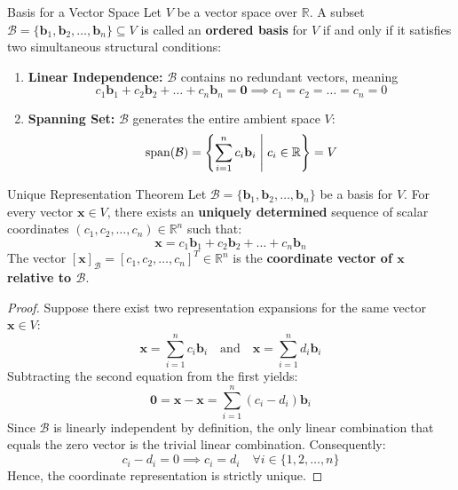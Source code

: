 \begin{definitionbox}{Basis for a Vector Space}
Let $V$ be a vector space over $\mathbb{R}$. A subset $\mathcal{B} = \{\mathbf{b}_1, \mathbf{b}_2, \dots, \mathbf{b}_n\} \subseteq V$ is called an \textbf{ordered basis} for $V$ if and only if it satisfies two simultaneous structural conditions:
\begin{enumerate}
    \item \textbf{Linear Independence:} $\mathcal{B}$ contains no redundant vectors, meaning
    \begin{equation}
    c_1 \mathbf{b}_1 + c_2 \mathbf{b}_2 + \dots + c_n \mathbf{b}_n = \mathbf{0} \implies c_1 = c_2 = \dots = c_n = 0
    \end{equation}
    \item \textbf{Spanning Set:} $\mathcal{B}$ generates the entire ambient space $V$:
    \begin{equation}
    \operatorname{span}(\mathcal{B}) = \left\{ \sum_{i=1}^n c_i \mathbf{b}_i \;\middle|\; c_i \in \mathbb{R} \right\} = V
    \end{equation}
\end{enumerate}
\end{definitionbox}

\begin{theorembox}{Unique Representation Theorem}
Let $\mathcal{B} = \{\mathbf{b}_1, \mathbf{b}_2, \dots, \mathbf{b}_n\}$ be a basis for $V$. For every vector $\mathbf{x} \in V$, there exists an \textbf{uniquely determined} sequence of scalar coordinates $(c_1, c_2, \dots, c_n) \in \mathbb{R}^n$ such that:
\begin{equation}
\mathbf{x} = c_1 \mathbf{b}_1 + c_2 \mathbf{b}_2 + \dots + c_n \mathbf{b}_n
\end{equation}
The vector $[\mathbf{x}]_\mathcal{B} = [c_1, c_2, \dots, c_n]^T \in \mathbb{R}^n$ is the \textbf{coordinate vector of $\mathbf{x}$ relative to $\mathcal{B}$}.
\end{theorembox}

\begin{proof}
Suppose there exist two representation expansions for the same vector $\mathbf{x} \in V$:
\begin{equation*}
\mathbf{x} = \sum_{i=1}^n c_i \mathbf{b}_i \quad \text{and} \quad \mathbf{x} = \sum_{i=1}^n d_i \mathbf{b}_i
\end{equation*}
Subtracting the second equation from the first yields:
\begin{equation*}
\mathbf{0} = \mathbf{x} - \mathbf{x} = \sum_{i=1}^n (c_i - d_i) \mathbf{b}_i
\end{equation*}
Since $\mathcal{B}$ is linearly independent by definition, the only linear combination that equals the zero vector is the trivial linear combination. Consequently:
\begin{equation*}
c_i - d_i = 0 \implies c_i = d_i \quad \forall i \in \{1, 2, \dots, n\}
\end{equation*}
Hence, the coordinate representation is strictly unique.
\end{proof}

